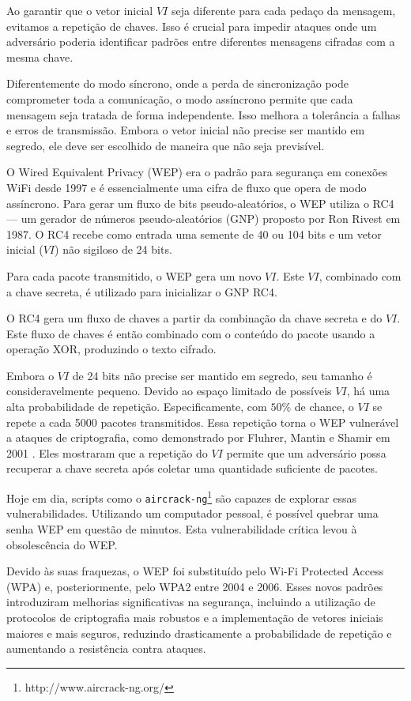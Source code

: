 Ao garantir que o vetor inicial $VI$ seja diferente para cada pedaço da mensagem, evitamos a repetição de chaves.
Isso é crucial para impedir ataques onde um adversário poderia identificar padrões entre diferentes mensagens cifradas com a mesma chave.

Diferentemente do modo síncrono, onde a perda de sincronização pode comprometer toda a comunicação, o modo assíncrono permite que cada mensagem seja tratada de forma independente.
Isso melhora a tolerância a falhas e erros de transmissão.
Embora o vetor inicial não precise ser mantido em segredo, ele deve ser escolhido de maneira que não seja previsível.


\begin{example}
  O Wired Equivalent Privacy (WEP) era o padrão para segurança em conexões WiFi desde 1997 e é essencialmente uma cifra de fluxo que opera de modo assíncrono.
  Para gerar um fluxo de bits pseudo-aleatórios, o WEP utiliza o RC4 \cite{Rivest16} — um gerador de números pseudo-aleatórios (GNP) proposto por Ron Rivest em 1987.
  O RC4 recebe como entrada uma semente de 40 ou 104 bits e um vetor inicial ($VI$) não sigiloso de 24 bits.

  Para cada pacote transmitido, o WEP gera um novo $VI$.
  Este $VI$, combinado com a chave secreta, é utilizado para inicializar o GNP RC4.

  O RC4 gera um fluxo de chaves a partir da combinação da chave secreta e do $VI$.
  Este fluxo de chaves é então combinado com o conteúdo do pacote usando a operação XOR, produzindo o texto cifrado.

  Embora o $VI$ de 24 bits não precise ser mantido em segredo, seu tamanho é consideravelmente pequeno.
  Devido ao espaço limitado de possíveis $VI$, há uma alta probabilidade de repetição.
  Especificamente, com $50\%$ de chance, o $VI$ se repete a cada 5000 pacotes transmitidos.
  Essa repetição torna o WEP vulnerável a ataques de criptografia, como demonstrado por Fluhrer, Mantin e Shamir em 2001 \cite{Fluhrer01}.
  Eles mostraram que a repetição do $VI$ permite que um adversário possa recuperar a chave secreta após coletar uma quantidade suficiente de pacotes.

  Hoje em dia, scripts como o {\tt aircrack-ng}\footnote{http://www.aircrack-ng.org/} são capazes de explorar essas vulnerabilidades.
  Utilizando um computador pessoal, é possível quebrar uma senha WEP em questão de minutos.
  Esta vulnerabilidade crítica levou à obsolescência do WEP.

  Devido às suas fraquezas, o WEP foi substituído pelo Wi-Fi Protected Access (WPA) e, posteriormente, pelo WPA2 entre 2004 e 2006.
  Esses novos padrões introduziram melhorias significativas na segurança, incluindo a utilização de protocolos de criptografia mais robustos e a implementação de vetores iniciais maiores e mais seguros, reduzindo drasticamente a probabilidade de repetição e aumentando a resistência contra ataques.

\end{example}

